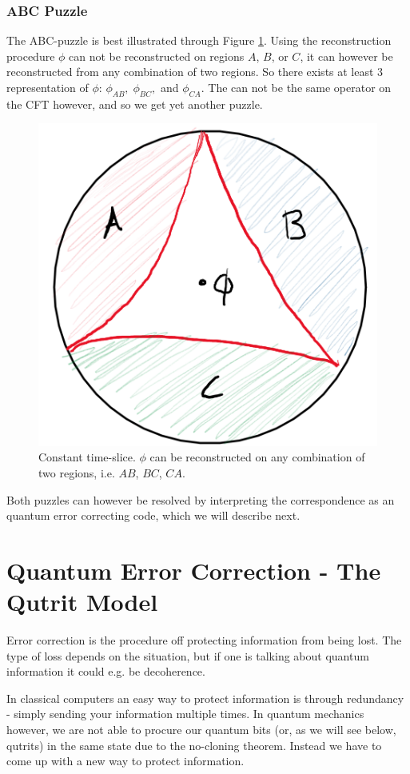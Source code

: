 \documentclass[letter,12pt]{article}
\begin{document}
\subsubsection*{ABC Puzzle}
The ABC-puzzle is best illustrated through Figure \ref{fig:adscftfig4}. Using the reconstruction procedure $\phi$ can not be reconstructed on regions $A$, $B$, or $C$, it can however be reconstructed from any combination of two regions. So there exists at least 3 representation of $\phi$: $\phi_{AB},\; \phi_{BC},$ and $\phi_{CA}$. The can not be the same operator on the CFT however, and so we get yet another puzzle. 
\begin{figure}[]
	\centering
	\includegraphics[width=0.3\linewidth]{ADS_CFT_Fig4}
	\caption{Constant time-slice. $\phi$ can be reconstructed on any
combination of two regions, i.e. $AB$, $BC$, $CA$.
}
	\label{fig:adscftfig4}
\end{figure}

Both puzzles can however be resolved by interpreting the correspondence as an quantum error correcting code, which we will describe next.

\section{Quantum Error Correction - The Qutrit Model}
Error correction is the procedure off protecting information from being lost. The type of loss depends on the situation, but if one is talking about quantum information it could e.g. be decoherence. 

In classical computers an easy way to protect information is through redundancy - simply sending your information multiple times. In quantum mechanics however, we are not able to procure our quantum bits (or, as we will see below, qutrits) in the same state due to the no-cloning theorem. Instead we have to come up with a new way to protect information. 
\end{document}
